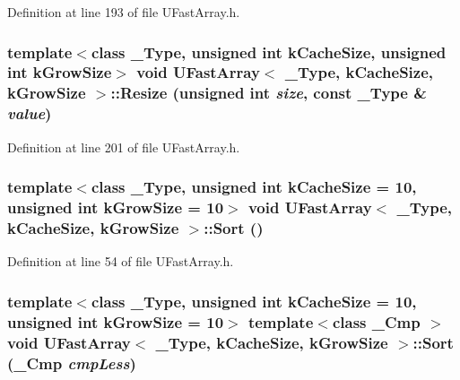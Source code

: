 Definition at line 193 of file UFastArray.h.\hypertarget{class_u_fast_array_406813631148524e47f65bb3be44db61}{
\subsubsection[{Resize}]{\setlength{\rightskip}{0pt plus 5cm}template$<$class \_\-Type, unsigned int kCacheSize, unsigned int kGrowSize$>$ void {\bf UFastArray}$<$ \_\-Type, kCacheSize, kGrowSize $>$::Resize (unsigned int {\em size}, \/  const \_\-Type \& {\em value})}}
\label{class_u_fast_array_406813631148524e47f65bb3be44db61}




Definition at line 201 of file UFastArray.h.\hypertarget{class_u_fast_array_0014e3fe79bdb6c69e4e37028a38d5ff}{
\subsubsection[{Sort}]{\setlength{\rightskip}{0pt plus 5cm}template$<$class \_\-Type, unsigned int kCacheSize = 10, unsigned int kGrowSize = 10$>$ void {\bf UFastArray}$<$ \_\-Type, kCacheSize, kGrowSize $>$::Sort ()}}
\label{class_u_fast_array_0014e3fe79bdb6c69e4e37028a38d5ff}




Definition at line 54 of file UFastArray.h.\hypertarget{class_u_fast_array_3dff70d6c3f2ed43048a54311c842379}{
\subsubsection[{Sort}]{\setlength{\rightskip}{0pt plus 5cm}template$<$class \_\-Type, unsigned int kCacheSize = 10, unsigned int kGrowSize = 10$>$ template$<$class \_\-Cmp $>$ void {\bf UFastArray}$<$ \_\-Type, kCacheSize, kGrowSize $>$::Sort (\_\-Cmp {\em cmpLess})}}
\label{class_u_fast_array_3dff70d6c3f2ed43048a54311c842379}




